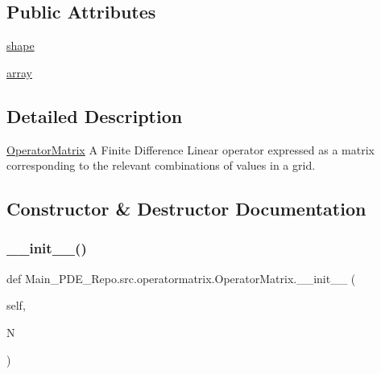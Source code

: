 \subsection*{Public Attributes}
\begin{DoxyCompactItemize}
\item 
\hyperlink{classMain__PDE__Repo_1_1src_1_1operatormatrix_1_1OperatorMatrix_aa973994badfd46a4774be7d9399838e3}{shape}
\item 
\hyperlink{classMain__PDE__Repo_1_1src_1_1operatormatrix_1_1OperatorMatrix_a85c4c68c7cb184de85df6280358ee3d5}{array}
\end{DoxyCompactItemize}


\subsection{Detailed Description}
\hyperlink{classMain__PDE__Repo_1_1src_1_1operatormatrix_1_1OperatorMatrix}{Operator\+Matrix} A Finite Difference Linear operator expressed as a matrix corresponding to the relevant combinations of values in a grid. 

\subsection{Constructor \& Destructor Documentation}
\mbox{\label{classMain__PDE__Repo_1_1src_1_1operatormatrix_1_1OperatorMatrix_a15495a68ab1363574aa90ce186112902}} 
\subsubsection{\texorpdfstring{\+\_\+\+\_\+init\+\_\+\+\_\+()}{\_\_init\_\_()}}
{\footnotesize\ttfamily def Main\+\_\+\+P\+D\+E\+\_\+\+Repo.\+src.\+operatormatrix.\+Operator\+Matrix.\+\_\+\+\_\+init\+\_\+\+\_\+ (\begin{DoxyParamCaption}\item[{}]{self,  }\item[{}]{N }\end{DoxyParamCaption})}



